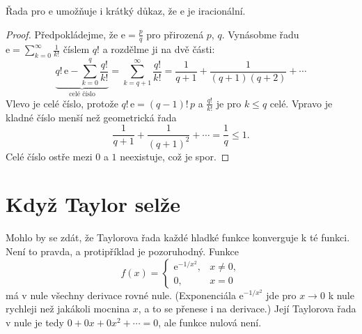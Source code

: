 Řada pro $\mathrm{e}$ umožňuje i krátký důkaz, že $\mathrm{e}$ je iracionální.

\begin{proof}
  Předpokládejme, že $\mathrm{e} = \frac{p}{q}$ pro přirozená $p$, $q$. Vynásobme řadu $\mathrm{e} = \sum_{k=0}^{\infty}\frac{1}{k!}$ číslem $q!$ a rozdělme ji na dvě části:
  \begin{equation*}
    \underbrace{q!\,\mathrm{e} - \sum_{k=0}^{q}\frac{q!}{k!}}_{\text{celé číslo}} = \sum_{k=q+1}^{\infty}\frac{q!}{k!} = \frac{1}{q + 1} + \frac{1}{(q + 1)(q + 2)} + \cdots
  \end{equation*}
  Vlevo je celé číslo, protože $q!\,\mathrm{e} = (q - 1)!\,p$ a $\frac{q!}{k!}$ je pro $k\leq q$ celé. Vpravo je kladné číslo menší než geometrická řada
  \begin{equation*}
    \frac{1}{q + 1} + \frac{1}{{(q + 1)}^2} + \cdots = \frac{1}{q}\leq 1.
  \end{equation*}
  Celé číslo ostře mezi $0$ a $1$ neexistuje, což je spor.
\end{proof}

\section{Když Taylor selže}

Mohlo by se zdát, že Taylorova řada každé hladké funkce konverguje k té funkci. Není to pravda, a protipříklad je pozoruhodný. Funkce
\begin{equation*}
  f(x) = \begin{cases}\mathrm{e}^{-1/x^2}, & x\neq 0,\\ 0, & x = 0\end{cases}
\end{equation*}
má v nule všechny derivace rovné nule. (Exponenciála $\mathrm{e}^{-1/x^2}$ jde pro $x\to 0$ k nule rychleji než jakákoli mocnina $x$, a to se přenese i na derivace.) Její Taylorova řada v nule je tedy $0 + 0x + 0x^2 + \cdots = 0$, ale funkce nulová není.

\begin{center}
\end{center}

